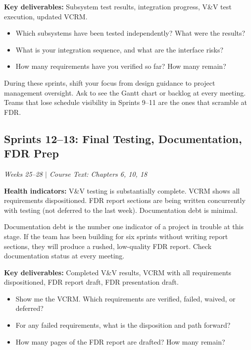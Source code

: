 \textbf{Key deliverables:} Subsystem test results, integration progress, V\&V test execution, updated VCRM.

\begin{paquestion}
\begin{itemize}[nosep,leftmargin=1.5em]
\item Which subsystems have been tested independently? What were the results?
\item What is your integration sequence, and what are the interface risks?
\item How many requirements have you verified so far? How many remain?
\end{itemize}
\end{paquestion}

\begin{paaction}
During these sprints, shift your focus from design guidance to project management oversight. Ask to see the Gantt chart or backlog at every meeting. Teams that lose schedule visibility in Sprints 9--11 are the ones that scramble at FDR.
\end{paaction}


\subsection{Sprints 12--13: Final Testing, Documentation, FDR Prep}
\textit{Weeks 25--28 $|$ Course Text: Chapters 6, 10, 18}

\textbf{Health indicators:} V\&V testing is substantially complete. VCRM shows all requirements dispositioned. FDR report sections are being written concurrently with testing (not deferred to the last week). Documentation debt is minimal.

\begin{redflag}
Documentation debt is the number one indicator of a project in trouble at this stage. If the team has been building for six sprints without writing report sections, they will produce a rushed, low-quality FDR report. Check documentation status at every meeting.
\end{redflag}

\textbf{Key deliverables:} Completed V\&V results, VCRM with all requirements dispositioned, FDR report draft, FDR presentation draft.

\begin{paquestion}
\begin{itemize}[nosep,leftmargin=1.5em]
\item Show me the VCRM. Which requirements are verified, failed, waived, or deferred?
\item For any failed requirements, what is the disposition and path forward?
\item How many pages of the FDR report are drafted? How many remain?
\end{itemize}
\end{paquestion}

